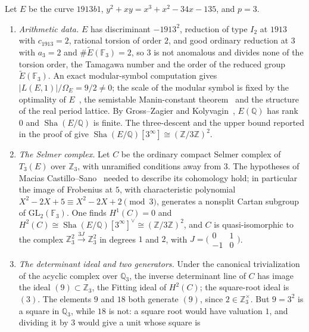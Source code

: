 \documentclass[11pt]{article}
\theoremstyle{definition}
\newcommand{\Q}{\mathbb{Q}}
\newcommand{\Z}{\mathbb{Z}}
\newcommand{\Sha}{\operatorname{Sha}}
\begin{document}
\begin{example}[An ordinary Selmer complex at $p=3$]\label{ex:closure:1913b1}
Let $E$ be the curve $1913b1$, $y^2+xy=x^3+x^2-34x-135$, and $p=3$.
\begin{enumerate}
\item \emph{Arithmetic data.}  $E$ has discriminant $-1913^2$, reduction
  of type $I_2$ at $1913$ with $c_{1913}=2$, rational torsion of order
  $2$, and good ordinary reduction at $3$ with $a_3=2$ and
  $\#\widetilde E(\mathbb F_3)=2$, so $3$ is not anomalous and divides none of the torsion order, the
  Tamagawa number and the order of the reduced group
  $\widetilde E(\mathbb F_3)$.  An exact modular-symbol computation gives
  $|L(E,1)|/\Omega_E=9/2\neq0$; the scale of the modular symbol is fixed
  by the optimality of $E$~\citep[Table~1]{Miller2011}, the semistable
  Manin-constant theorem~\citep{Cesnavicius2018} and the structure of the
  real period lattice.  By Gross--Zagier and
  Kolyvagin~\citep{GrossZagier1986,Kolyvagin1989}, $E(\Q)$ has rank $0$
  and $\Sha(E/\Q)$ is finite.  The
  three-descent and the upper bound reported in the proof of
  \citet[Theorem~7.2]{Miller2011} give $\Sha(E/\Q)[3^\infty]\cong(\Z/3\Z)^2$.
\item \emph{The Selmer complex.}  Let $C$ be the ordinary compact Selmer
  complex of $T_3(E)$ over $\Z_3$, with unramified conditions away from
  $3$.  The hypotheses of Macias Castillo--Sano~\citep{MaciasCastilloSano2026}
  needed to describe its cohomology hold; in particular the image of
  Frobenius at $5$, with characteristic polynomial $X^2-2X+5\equiv
  X^2-2X+2\pmod 3$, generates a nonsplit Cartan subgroup of
  $\mathrm{GL}_2(\mathbb F_3)$.  One finds $H^1(C)=0$ and
  $H^2(C)\cong\Sha(E/\Q)[3^\infty]^{\vee}\cong(\Z/3\Z)^2$, and $C$ is
  quasi-isomorphic to the complex $\Z_3^2\xrightarrow{\,3J\,}\Z_3^2$ in
  degrees $1$ and $2$, with
  $J=\bigl(\begin{smallmatrix}0&1\\-1&0\end{smallmatrix}\bigr)$.
\item \emph{The determinant ideal and two generators.}  Under the
  canonical trivialization of the acyclic complex over $\Q_3$, the inverse
  determinant line of $C$ has image the ideal $(9)\subset\Z_3$, the
  Fitting ideal of $H^2(C)$; the square-root ideal is $(3)$.  The elements
  $9$ and $18$ both generate $(9)$, since $2\in\Z_3^\times$.  But $9=3^2$
  is a square in $\Q_3$, while $18$ is not: a square root would have
  valuation $1$, and dividing it by $3$ would give a unit whose square is

\end{enumerate}
\end{example}
\end{document}
